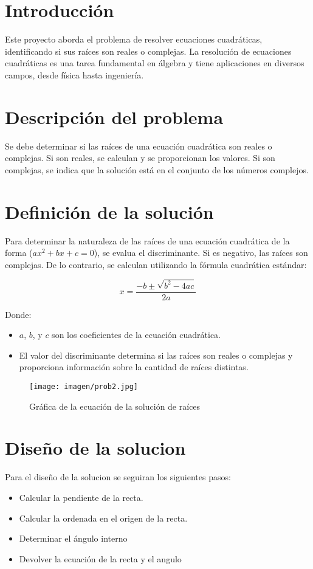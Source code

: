 \documentclass{IEEEcsmag}
\begin{document}
\section{Introducción}
Este proyecto aborda el problema de resolver ecuaciones cuadráticas, identificando si sus raíces son reales o complejas. La resolución de ecuaciones cuadráticas es una tarea fundamental en álgebra y tiene aplicaciones en diversos campos, desde física hasta ingeniería.

\section{Descripción del problema}
Se debe determinar si las raíces de una ecuación cuadrática son reales o complejas. Si son reales, se calculan y se proporcionan los valores. Si son complejas, se indica que la solución está en el conjunto de los números complejos.


\section{Definición de la solución}
Para determinar la naturaleza de las raíces de una ecuación cuadrática de la forma  (\(ax^2 + bx + c = 0\)), se evalua el discriminante. Si es negativo, las raíces son complejas. De lo contrario, se calculan utilizando la fórmula cuadrática estándar:

\[ x = \frac{-b \pm \sqrt{b^2 - 4ac}}{2a} \]

Donde:
\begin{itemize}
    \item \(a\), \(b\), y \(c\) son los coeficientes de la ecuación cuadrática.
    \item El valor del discriminante determina si las raíces son reales o complejas y proporciona información sobre la cantidad de raíces distintas.
\end{itemize}



\begin{figure}[h!]
    \centering
    \texttt{[image: imagen/prob2.jpg]}
    \caption{Gráfica de la ecuación de la solución de raíces}
    \label{fig:GraficaEcuacionRecta}
\end{figure}

\section{Diseño de la solucion}

Para el diseño de la solucion se seguiran los siguientes pasos:
\begin{itemize}
    \item Calcular la pendiente de la recta.
    \item Calcular la ordenada en el origen de la recta.
    \item Determinar el ángulo interno \alpha
    \item Devolver la ecuación de la recta y el angulo \alpha
\end{itemize}
\end{document}
